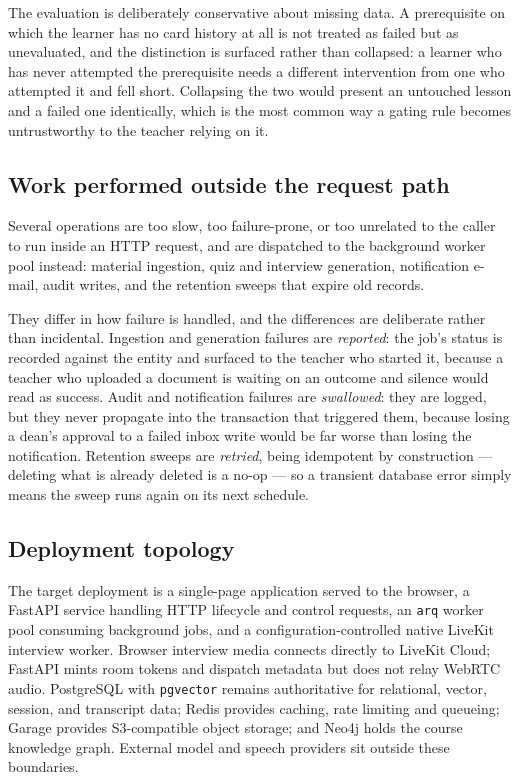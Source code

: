 The evaluation is deliberately conservative about missing data. A prerequisite on which the learner has no card history at all is not treated as failed but as unevaluated, and the distinction is surfaced rather than collapsed: a learner who has never attempted the prerequisite needs a different intervention from one who attempted it and fell short. Collapsing the two would present an untouched lesson and a failed one identically, which is the most common way a gating rule becomes untrustworthy to the teacher relying on it.

\subsection{Work performed outside the request path}

Several operations are too slow, too failure-prone, or too unrelated to the caller to run inside an HTTP request, and are dispatched to the background worker pool instead: material ingestion, quiz and interview generation, notification e-mail, audit writes, and the retention sweeps that expire old records.

They differ in how failure is handled, and the differences are deliberate rather than incidental. Ingestion and generation failures are \emph{reported}: the job's status is recorded against the entity and surfaced to the teacher who started it, because a teacher who uploaded a document is waiting on an outcome and silence would read as success. Audit and notification failures are \emph{swallowed}: they are logged, but they never propagate into the transaction that triggered them, because losing a dean's approval to a failed inbox write would be far worse than losing the notification. Retention sweeps are \emph{retried}, being idempotent by construction --- deleting what is already deleted is a no-op --- so a transient database error simply means the sweep runs again on its next schedule.

\subsection{Deployment topology}

The target deployment is a single-page application served to the browser, a FastAPI service handling HTTP lifecycle and control requests, an \texttt{arq} worker pool consuming background jobs, and a configuration-controlled native LiveKit interview worker. Browser interview media connects directly to LiveKit Cloud; FastAPI mints room tokens and dispatch metadata but does not relay WebRTC audio. PostgreSQL with \texttt{pgvector} remains authoritative for relational, vector, session, and transcript data; Redis provides caching, rate limiting and queueing; Garage provides S3-compatible object storage; and Neo4j holds the course knowledge graph. External model and speech providers sit outside these boundaries.

